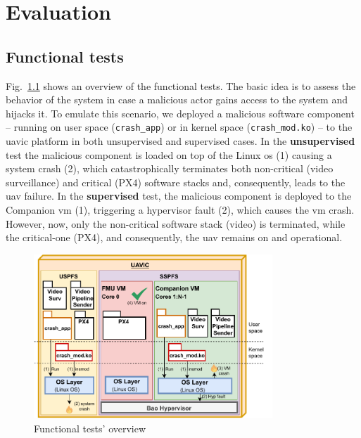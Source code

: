 %
\chapter{Evaluation}
\label{cha:evaluation}

\section{Functional tests}
\label{sec:functional-tests}
Fig.~\ref{fig:uav-main-eval-kmod} shows an overview of the functional
tests. The basic idea is to assess the behavior of the system in case a
malicious actor gains access to the system and hijacks it. 
To emulate this scenario, we deployed a malicious software component -- running
on user space (\lstinline{crash_app}) or in kernel space (\lstinline{crash_mod.ko})
-- to the \gls{uavic} platform in both unsupervised and
supervised cases. In the \textbf{unsupervised}
test the malicious component is loaded on top of the Linux \gls{os} (1) causing
a system crash (2), which catastrophically terminates both non-critical (video
surveillance) and critical (PX4) software stacks and, consequently, leads to the
\gls{uav} failure. In the \textbf{supervised} test, the malicious component is deployed to the Companion \gls{vm} (1), triggering a
hypervisor fault (2), which causes the \gls{vm} crash. However, now, only the
non-critical software stack (video) is terminated, while the critical-one (PX4),
and consequently, the \gls{uav} remains on and operational.

\begin{figure}[!hbt]
  \centering
  \includegraphics[width=0.8\textwidth]{./img/pdf/uav-main-eval-funcTest} 
%   
  \caption{Functional tests' overview}%
  \label{fig:uav-main-eval-kmod}
\end{figure}

